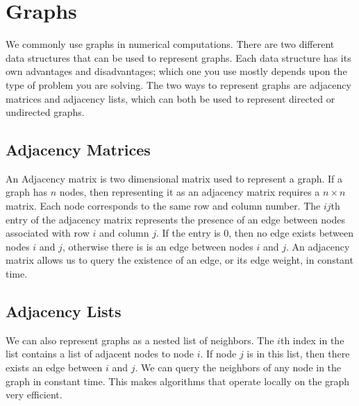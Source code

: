 \label{lab:SixDegreesKevinBacon}


\section*{Graphs}
We commonly use graphs in numerical computations.
There are two different data structures that can be used to represent graphs.
Each data structure has its own advantages and disadvantages;
which one you use mostly depends upon the type of problem you are solving.
The two ways to represent graphs are adjacency matrices and adjacency lists, which can both be used to represent directed or undirected graphs.

\subsection*{Adjacency Matrices}
An Adjacency matrix is two dimensional matrix used to represent a graph.
If a graph has $n$ nodes, then representing it as an adjacency matrix requires a $n \times n$ matrix. Each node corresponds to the same row and column number.
The $ij$th entry of the adjacency matrix represents the presence of an edge between nodes associated with row $i$ and column $j$.
If the entry is 0, then no edge exists between nodes $i$ and $j$, otherwise there is is an edge between nodes $i$ and $j$.
An adjacency matrix allows us to query the existence of an edge, or its edge weight, in constant time.

\subsection*{Adjacency Lists}
We can also represent graphs as a nested list of neighbors.
The $i$th index in the list contains a list of adjacent nodes to node $i$.
If node $j$ is in this list, then there exists an edge between $i$ and $j$.
We can query the neighbors of any node in the graph in constant time.
This makes algorithms that operate locally on the graph very efficient.

